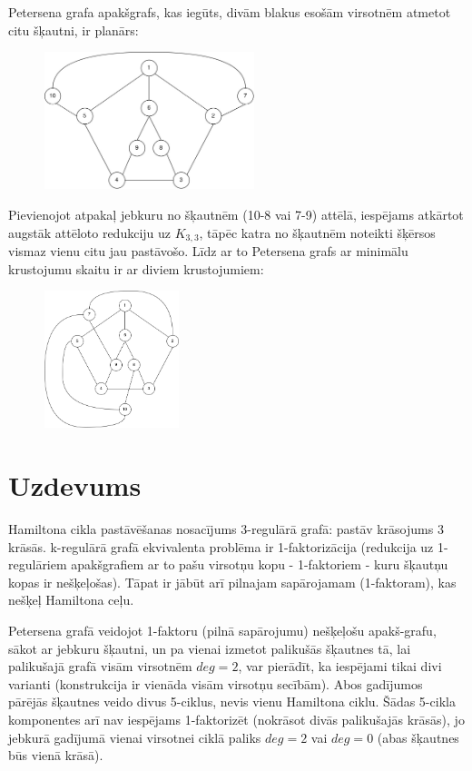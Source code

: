\documentclass[12pt, a4paper]{article}
\begin{document}
Petersena grafa apakšgrafs, kas iegūts, divām blakus esošām virsotnēm atmetot citu šķautni, ir planārs:

\begin{figure}[h!]
    \centering
    \includegraphics[height=4cm,page=1]{task2-2.jpeg}
\end{figure}

Pievienojot atpakaļ jebkuru no šķautnēm (10-8 vai 7-9) attēlā, iespējams atkārtot augstāk attēloto redukciju uz $K_{3,3}$, tāpēc katra no šķautnēm noteikti šķērsos vismaz vienu citu jau pastāvošo. Līdz ar to Petersena grafs ar minimālu krustojumu skaitu ir ar diviem krustojumiem:

\begin{figure}[h!]
    \centering
    \includegraphics[height=4cm,page=1]{task2-3.jpeg}
\end{figure}


\newpage
\section{Uzdevums}

Hamiltona cikla pastāvēšanas nosacījums 3-regulārā grafā: pastāv krāsojums 3 krāsās. k-regulārā grafā ekvivalenta problēma ir 1-faktorizācija (redukcija uz 1-regulāriem apakšgrafiem ar to pašu virsotņu kopu - 1-faktoriem - kuru šķautņu kopas ir nešķeļošas). Tāpat ir jābūt arī pilnajam sapārojamam (1-faktoram), kas nešķeļ Hamiltona ceļu.

Petersena grafā veidojot 1-faktoru (pilnā sapārojumu) nešķeļošu apakš-grafu, sākot ar jebkuru šķautni, un pa vienai izmetot palikušās šķautnes tā, lai palikušajā grafā visām virsotnēm $deg=2$, var pierādīt, ka iespējami tikai divi varianti (konstrukcija ir vienāda visām virsotņu secībām). Abos gadījumos pārējās šķautnes veido divus 5-ciklus, nevis vienu Hamiltona ciklu. Šādas 5-cikla komponentes arī nav iespējams 1-faktorizēt (nokrāsot divās palikušajās krāsās), jo jebkurā gadījumā vienai virsotnei ciklā paliks $deg=2$ vai $deg=0$ (abas šķautnes būs vienā krāsā).
\end{document}
